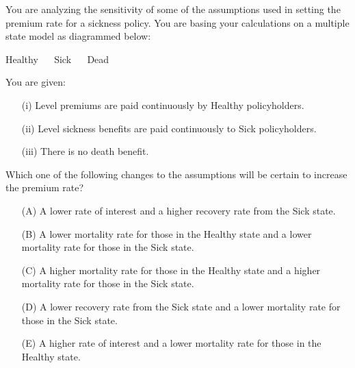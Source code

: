 You are analyzing the sensitivity of some of the assumptions used in setting the premium rate for a sickness policy.
 You are basing your calculations on a multiple state model as diagrammed below:
\begin{center} Healthy { \ \ } Sick { \ \ } Dead \end{center}
You are given:
\begin{itemize}
\item[(i)] Level premiums are paid continuously by Healthy policyholders.
\item[(ii)] Level sickness benefits are paid continuously to Sick policyholders.
\item[(iii)] There is no death benefit.
\end{itemize}
Which one of the following changes to the assumptions will be certain to increase the premium rate?
\begin{itemize}
\item[(A)] A lower rate of interest and a higher recovery rate from the Sick state.
\item[(B)] A lower mortality rate for those in the Healthy state and a lower mortality rate for those in the Sick state.
\item[(C)] A higher mortality rate for those in the Healthy state and a higher mortality rate for those in the Sick state.
\item[(D)] A lower recovery rate from the Sick state and a lower mortality rate for those in the Sick state.
\item[(E)] A higher rate of interest and a lower mortality rate for those in the Healthy state.
\end{itemize}
